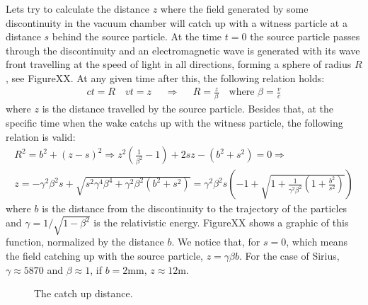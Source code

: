 \begin{apendicesenv}
    Lets try to calculate the distance $z$ where the field generated by some discontinuity in the vacuum chamber will catch up with a witness particle at a distance $s$ behind the source particle. At the time $t=0$ the source particle passes through the discontinuity and an electromagnetic wave is generated with its wave front travelling at the speed of light in all directions, forming a sphere of radius $R$, see FigureXX. At any given time after this, the following relation holds:
    \begin{align}
		ct = R \quad vt = z && \Rightarrow && R = \frac{z}{\beta} \quad \text{where} \,\, \beta = \frac{v}{c}
    \end{align}
    where $z$ is the distance travelled by the source particle. Besides that, at the specific time when the wake catchs up with the witness particle, the following relation is valid:
    \begin{align}
		R^2 = b^2 + (z-s)^2  \Rightarrow z^2(\frac{1}{\beta^2}-1) + 2sz - (b^2 + s^2) = 0  \Rightarrow \\
		z = -\gamma^2 \beta^2 s + \sqrt{s^2\gamma^4\beta^4 + \gamma^2\beta^2\left(b^2 + s^2\right)}  = \gamma^2 \beta^2 s\left(-1 + \sqrt{1 + \frac{1}{\gamma^2\beta^2}\left(1 + \frac{b^2}{s^2}\right)}\right)
    \end{align}
    where $b$ is the distance from the discontinuity to the trajectory of the particles and $\gamma = 1/\sqrt{1-\beta^2}$ is the relativistic energy. FigureXX shows a graphic of this function, normalized by the distance $b$. We notice that, for $s=0$, which means the field catching up with the source particle, $z = \gamma\beta b$. For the case of Sirius, $\gamma \approx 5870$ and $\beta \approx 1$, if $ b = 2$mm, $z \approx 12$m.

    \begin{figure}[hb!]
	    \centering
	    \label{fig:catch_up}
	    \caption{The catch up distance.}
    \end{figure}



\end{apendicesenv}
